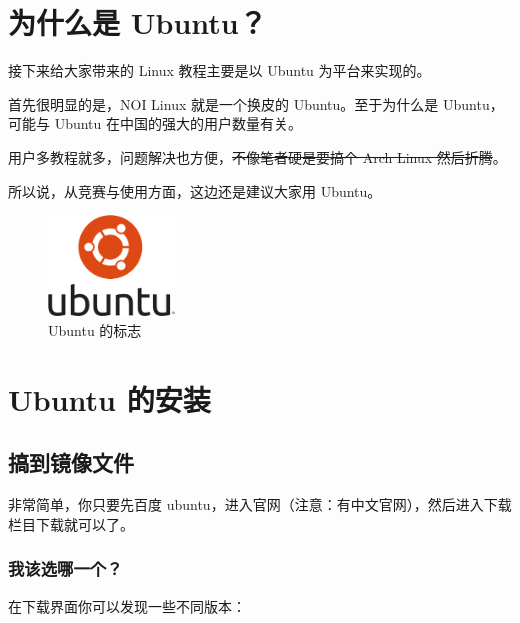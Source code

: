 \documentclass[UTF-8]{ctexart}
\begin{document}
	\section{为什么是 Ubuntu？}
	
		接下来给大家带来的 Linux 教程主要是以 Ubuntu 为平台来实现的。
	
		首先很明显的是，NOI Linux 就是一个换皮的 Ubuntu。至于为什么是 Ubuntu，可能与 Ubuntu 在中国的强大的用户数量有关。
		
		用户多教程就多，问题解决也方便，\sout{不像笔者硬是要搞个 Arch Linux 然后折腾}。
		
		所以说，从竞赛与使用方面，这边还是建议大家用 Ubuntu。
	
		\begin{figure}[H]
			\centering
			\includegraphics[width=0.3\textwidth]{fig/ubuntu.png}
			\caption*{Ubuntu 的标志}
		\end{figure}
	
	\newpage
	
	\section{Ubuntu 的安装}
	
		\subsection{搞到镜像文件}
		
			非常简单，你只要先百度 ubuntu，进入官网（注意：有中文官网），然后进入下载栏目下载就可以了。
			
			\subsubsection{我该选哪一个？}
			
				在下载界面你可以发现一些不同版本：
				
\end{document}
